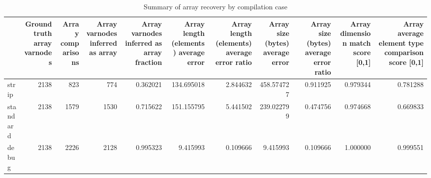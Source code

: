 \begin{table}
\centering
\caption{Summary of array recovery by compilation case}
\label{table:opts-array-comparisons-summary}
\begin{tabular}{lrrrrrrrrrr}
\toprule
{} &  Ground truth array varnodes &  Array comparisons &  Array varnodes inferred as array &  Array varnodes inferred as array fraction &  Array length (elements) average error &  Array length (elements) average error ratio &  Array size (bytes) average error &  Array size (bytes) average error ratio &  Array dimension match score [0,1] &  Array average element type comparison score [0,1] \\
\midrule
strip    &                         2138 &                823 &                               774 &                                   0.362021 &                             134.695018 &                                     2.844632 &                        458.574727 &                                0.911925 &                           0.979344 &                                           0.781288 \\
standard &                         2138 &               1579 &                              1530 &                                   0.715622 &                             151.155795 &                                     5.441502 &                        239.022799 &                                0.474756 &                           0.974668 &                                           0.669833 \\
debug    &                         2138 &               2226 &                              2128 &                                   0.995323 &                               9.415993 &                                     0.109666 &                          9.415993 &                                0.109666 &                           1.000000 &                                           0.999551 \\
\bottomrule
\end{tabular}
\end{table}
